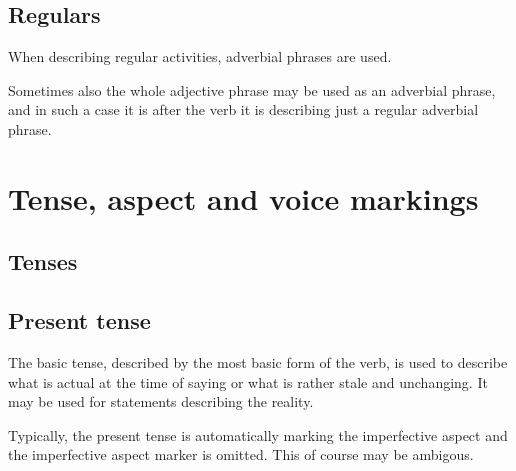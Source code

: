 \subsection{Regulars}

When describing regular activities, adverbial phrases are used.



Sometimes also the whole adjective phrase may be used as an adverbial phrase,
and in such a case it is after the verb it is describing just a regular
adverbial phrase.


\section{Tense, aspect and voice markings}
\label{sec:markers}

\subsection{Tenses}

\subsection{Present tense}

The basic tense, described by the most basic form of the verb, is used to
describe what is actual at the time of saying or what is rather stale and
unchanging. It may be used for statements describing the reality.

Typically, the present tense is automatically marking the imperfective aspect
and the imperfective aspect marker is omitted. This of course may be ambigous.





